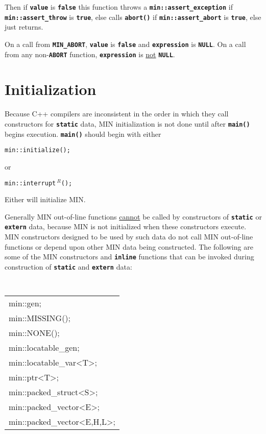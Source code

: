 \documentclass[12pt]{article}
\newcommand{\TT}[1]{{\tt \bfseries #1}}
\newcommand{\EOL}{\penalty \exhyphenpenalty}
\newcommand{\REL}{$\,^R$}
\begin{document}
Then if \TT{value} is \TT{false} this function throws a
\TT{min::\EOL assert\_\EOL exception} if 
\TT{min::\EOL assert\_\EOL throw} is \TT{true}, else
calls \TT{abort()} if \TT{min::\EOL assert\_\EOL abort} is \TT{true},
else just returns.

On a call from \TT{MIN\_ABORT}, \TT{value} is \TT{false} and
\TT{expression} is \TT{NULL}.  On a call from any non-\TT{ABORT}
function, \TT{expression} is \underline{not} \TT{NULL}.


\section{Initialization}

Because C++ compilers are inconsistent in the order in which they
call constructors for \TT{static} data, MIN initialization is
not done until after \TT{main()} begins execution.  \TT{main()}
should begin with either
\begin{center}
\tt min::initialize();
\end{center}
or
\begin{center}
\tt min::interrupt\REL();
\end{center}

Either will initialize MIN.

Generally MIN out-of-line functions \underline{cannot} be called
by constructors of \TT{static} or \TT{extern} data, because
MIN is not initialized when these constructors execute.
MIN constructors designed to be used by such data do not call
MIN out-of-line functions or depend upon other MIN data being
constructed.  The following are some of the MIN constructors
and \TT{inline} functions that can be invoked during construction
of \TT{static} and \TT{extern} data:
\begin{center}
\tt
\begin{tabular}{l}
min::gen; \\
min::MISSING(); \\
min::NONE(); \\
min::locatable\_gen; \\
min::locatable\_var<T>; \\
min::ptr<T>; \\
min::packed\_struct<S>; \\
min::packed\_vector<E>; \\
min::packed\_vector<E,H,L>; \\
\end{tabular}
\end{center}
\end{document}
